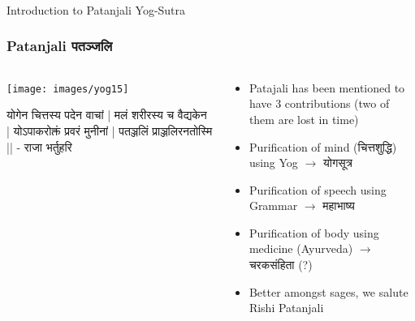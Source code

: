 \begin{frame}[fragile]\frametitle{}
\begin{center}
{\Large Introduction to Patanjali Yog-Sutra}
\end{center}
\end{frame}

 \begin{frame}[fragile]\frametitle{Patanjali  पतञ्जलि }
 
    \begin{columns}
    \begin{column}[t]{0.4\linewidth}
	
\begin{center}
\texttt{[image: images/yog15]}
\end{center}

\begin{sanskrit}
योगेन चित्तस्य पदेन वाचां |
मलं शरीरस्य च वैद्यकेन |
योऽपाकरोक्तं प्रवरं मुनीनां |
पतञ्जलिं प्राञ्जलिरनतोस्मि ||
- राजा भर्तुहरि
\end{sanskrit}

    \end{column}
    \begin{column}[t]{0.6\linewidth}
		\begin{itemize}
	\item Patajali has been mentioned to have 3 contributions (two of them are lost in time)
	\item Purification of mind (चित्तशुद्धि) using Yog $\rightarrow$ योगसूत्र 
	\item Purification of speech using Grammar  $\rightarrow$  महाभाष्य 
	\item Purification of body using medicine (Ayurveda)  $\rightarrow$  चरकसंहिता (?)
	\item Better amongst sages, we salute Rishi Patanjali
	\end{itemize}

    \end{column}
  \end{columns}
\end{frame}

